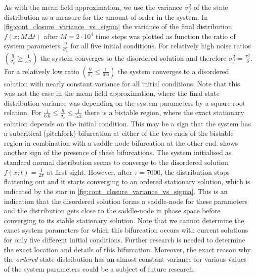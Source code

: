 As with the mean field approximation, we use the variance $\sigma_f^2$ of the state distribution as a measure for the amount of order in the system. In \cref{fig:cont_closure_variance_vs_sigma} the variance of the final distribution $f(x;M\Delta t)$ after $M=2\cdot 10^4$ time steps was plotted as function the ratio of system parameters $\frac{\eta}{\sigma_c}$ for all five initial conditions. For relatively high noise ratios $\left(\frac{\eta}{\sigma_c} \ge \frac{1}{5.2}\right)$ the system converges to the disordered solution and therefore $\sigma_f^2=\frac{\pi^2}{3}$. For a relatively low ratio $\left(\frac{\eta}{\sigma_c} \le \frac{1}{6.6}\right)$ the system converges to a disordered solution with nearly constant variance for all initial conditions. Note that this was not the case in the mean field approximation, where the final state distribution variance was depending on the system parameters by a square root relation. For $\frac{1}{6.6}\le\frac{\eta}{\sigma_c}\le\frac{1}{5.2}$ there is a bistable region, where the exact stationary solution depends on the initial condition. This may be a sign that the system has a subcritical (pitchfork) bifurcation at either of the two ends of the bistable region in combination with a saddle-node bifurcation at the other end.  shows another sign of the presence of these bifurcations. The system initialised as standard normal distribution seems to converge to the disordered solution $f(x;t) = \frac{1}{2\pi}$ at first sight. However, after $\tau=7000$, the distribution stops flattening out and it starts converging to an ordered stationary solution, which is indicated by the star in \cref{fig:cont_closure_variance_vs_sigma}. This is an indication that the disordered solution forms a saddle-node for these parameters and the distribution gets close to the saddle-node in phase space before converging to its stable stationary solution. 
Note that we cannot determine the exact system parameters for which this bifurcation occurs with current solutions for only five different initial conditions. Further research is needed to determine the exact location and details of this bifurcation. Moreover, the exact reason why the \textit{ordered} state distribution has an almost constant variance for various values of the system parameters could be a subject of future research. 

